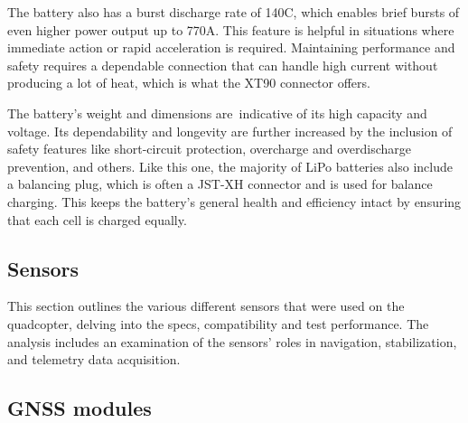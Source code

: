 \documentclass{article}
\begin{document}
The battery also has a burst discharge rate of 140C, which enables brief bursts of even higher power output up to 770A. This feature is helpful in situations where immediate action or rapid acceleration is required. Maintaining performance and safety requires a dependable connection that can handle high current without producing a lot of heat, 
which is what the XT90 connector offers.

The battery's weight and dimensions are indicative of its high capacity and voltage. Its dependability and longevity are further increased by the inclusion of safety features like short-circuit protection, overcharge and overdischarge prevention, and others. Like this one, the majority of LiPo batteries also include a balancing plug, which is 
often a JST-XH connector and is used for balance charging. This keeps the battery's general health and efficiency intact by ensuring that each cell is charged equally.

\subsection{Sensors}
This section outlines the various different sensors that were used on the quadcopter, delving into the specs, compatibility and test performance. The analysis includes an examination of the sensors' roles in navigation, stabilization, and telemetry data acquisition.

\subsection*{GNSS modules}
\end{document}
